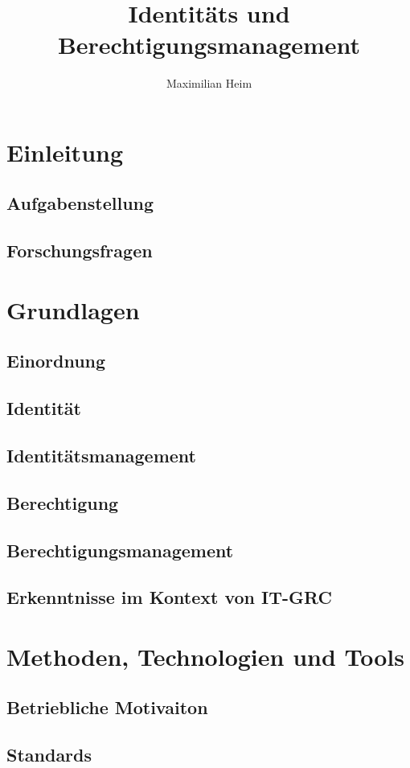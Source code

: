 \documentclass[10pt]{article}
\author{Maximilian Heim}
\title{Identitäts und Berechtigungsmanagement}
\begin{document}
\maketitle
\newpage
\tableofcontents
\newpage
\section{Einleitung}
\subsection{Aufgabenstellung}
\subsection{Forschungsfragen}
\section{Grundlagen}
\subsection{Einordnung}
\subsection{Identität}
\subsection{Identitätsmanagement}
\subsection{Berechtigung}
\subsection{Berechtigungsmanagement}
\subsection{Erkenntnisse im Kontext von IT-GRC}
\section{Methoden, Technologien und Tools}
\subsection{Betriebliche Motivaiton}
\subsection{Standards}
\end{document}
